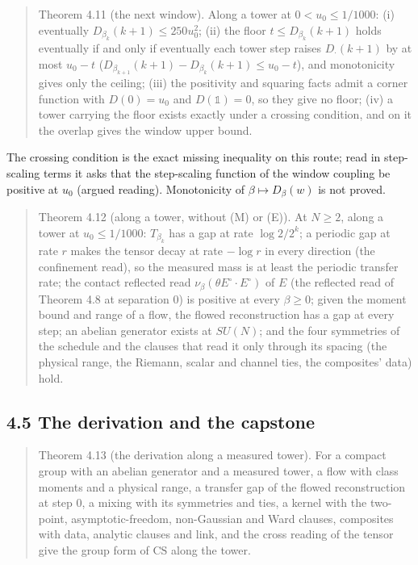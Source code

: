 \documentclass[10pt,letterpaper,twocolumn]{article}
\begin{document}
\begin{quote}
Theorem 4.11 (the next window). Along a tower at \(0<u_0\le1/1000\): (i) eventually \(D_{\beta_k}(k+1)\le250u_0^2\); (ii) the floor \(t\le D_{\beta_k}(k+1)\) holds eventually if and only if eventually each tower step raises \(D_\cdot(k+1)\) by at most \(u_0-t\) (\(D_{\beta_{k+1}}(k+1)-D_{\beta_k}(k+1)\le u_0-t\)), and monotonicity gives only the ceiling; (iii) the positivity and squaring facts admit a corner function with \(D(0)=u_0\) and \(D(\mathbb 1)=0\), so they give no floor; (iv) a tower carrying the floor exists exactly under a crossing condition, and on it the overlap gives the window upper bound.
\end{quote}

The crossing condition is the exact missing inequality on this route; read in step-scaling terms it asks that the step-scaling function of the window coupling be positive at \(u_0\) (argued reading). Monotonicity of \(\beta\mapsto D_\beta(w)\) is not proved.

\begin{quote}
Theorem 4.12 (along a tower, without (M) or (E)). At \(N\ge2\), along a tower at \(u_0\le1/1000\): \(T_{\beta_k}\) has a gap at rate \(\log2/2^k\); a periodic gap at rate \(r\) makes the tensor decay at rate \(-\log r\) in every direction (the confinement read), so the measured mass is at least the periodic transfer rate; the contact reflected read \(\nu_\beta(\theta E^\circ\cdot E^\circ)\) of \(E\) (the reflected read of Theorem 4.8 at separation \(0\)) is positive at every \(\beta\ge0\); given the moment bound and range of a flow, the flowed reconstruction has a gap at every step; an abelian generator exists at \(SU(N)\); and the four symmetries of the schedule and the clauses that read it only through its spacing (the physical range, the Riemann, scalar and channel ties, the composites' data) hold.
\end{quote}

\subsection{4.5 The derivation and the capstone}\label{45-the-derivation-and-the-capstone}

\begin{quote}
Theorem 4.13 (the derivation along a measured tower). For a compact group with an abelian generator and a measured tower, a flow with class moments and a physical range, a transfer gap of the flowed reconstruction at step \(0\), a mixing with its symmetries and ties, a kernel with the two-point, asymptotic-freedom, non-Gaussian and Ward clauses, composites with data, analytic clauses and link, and the cross reading of the tensor give the group form of \(\mathrm{CS}\) along the tower.
\end{quote}
\end{document}
